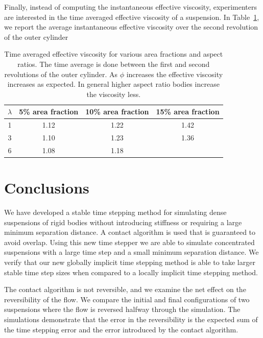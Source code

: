 \documentclass[AMA,STIX1COL]{WileyNJD-v2}
\begin{document}
Finally, instead of computing the instantaneous effective viscosity,
experimenters are interested in the time averaged effective viscosity of
a suspension. In Table~\ref{tab:viscosity}, we report the average
instantaneous effective viscosity over the second revolution of the
outer cylinder
\begin{table}[t]
  \centering
\caption{Time averaged effective viscosity for various area fractions
and aspect ratios. The time average is done between the first and second
revolutions of the outer cylinder. As $\phi$ increases the effective
viscosity increases as expected. In general higher aspect ratio bodies
increase the viscosity less. \label{tab:viscosity}}
\begin{tabular*}{500pt}{@{\extracolsep\fill}cccc@{\extracolsep\fill}}
  \toprule
$\lambda$ & 5\% area fraction  & 10\% area fraction  & 15\% area fraction\\
\midrule
1 & 1.12 & 1.22 & 1.42 \\
3 & 1.10 & 1.23 & 1.36 \\
6 & 1.08 & 1.18 &  \\
\bottomrule
\end{tabular*}
\end{table}



\section{Conclusions}\label{s:conclusions}
We have developed a stable time stepping method for
simulating dense suspensions of rigid bodies without introducing
stiffness or requiring a large minimum separation distance.  A contact
algorithm is used that is guaranteed to avoid overlap.  Using this new
time stepper we are able to simulate concentrated suspensions with a
large time step and a small minimum separation distance.  We verify that
our new globally implicit time stepping method is able to take
larger stable time step sizes when compared to a locally implicit
time stepping method.

The contact algorithm is not reversible, and we examine the net effect
on the reversibility of the flow.  We compare the initial and final
configurations of two suspensions where the flow is reversed halfway
through the simulation.  The simulations demonstrate that the error in
the reversibility is the expected sum of the time stepping error and the
error introduced by the contact algorithm.
\end{document}
